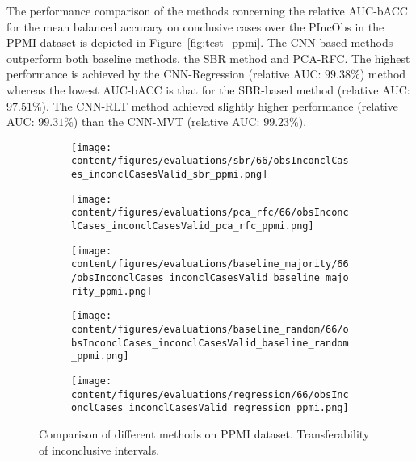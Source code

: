 The performance comparison of the methods concerning the relative AUC-bACC for the mean balanced accuracy on conclusive cases 
over the PIncObs in the PPMI dataset is depicted in Figure~\ref{fig:test_ppmi}.
The CNN-based methods outperform both baseline methods, the SBR method and PCA-RFC.
The highest performance is achieved by the CNN-Regression (relative AUC: $99.38\%$) method 
whereas the lowest AUC-bACC is that for the SBR-based method (relative AUC: $97.51\%$).
The CNN-RLT method achieved slightly higher performance (relative AUC: $99.31\%$) than the CNN-MVT (relative AUC: $99.23\%$).


\begin{figure}[ht]
  \begin{subfigure}{0.45\textwidth}
    \centering
    \texttt{[image: content/figures/evaluations/sbr/66/obsInconclCases\_inconclCasesValid\_sbr\_ppmi.png]}
  \end{subfigure}
  \hfill
  \begin{subfigure}{0.45\textwidth}
    \centering
    \texttt{[image: content/figures/evaluations/pca\_rfc/66/obsInconclCases\_inconclCasesValid\_pca\_rfc\_ppmi.png]}
  \end{subfigure}
  \hfill
  \begin{subfigure}{0.45\textwidth}
    \centering
    \texttt{[image: content/figures/evaluations/baseline\_majority/66/obsInconclCases\_inconclCasesValid\_baseline\_majority\_ppmi.png]}
  \end{subfigure}
  \hfill
  \begin{subfigure}{0.45\textwidth}
    \centering
    \texttt{[image: content/figures/evaluations/baseline\_random/66/obsInconclCases\_inconclCasesValid\_baseline\_random\_ppmi.png]}
  \end{subfigure}
  \hfill
  \begin{subfigure}{0.45\textwidth}
    \centering
    \texttt{[image: content/figures/evaluations/regression/66/obsInconclCases\_inconclCasesValid\_regression\_ppmi.png]}
  \end{subfigure}

  \caption{Comparison of different methods on PPMI dataset. Transferability of inconclusive intervals.}
  \label{fig:test_interval_match_ppmi}
\end{figure}

